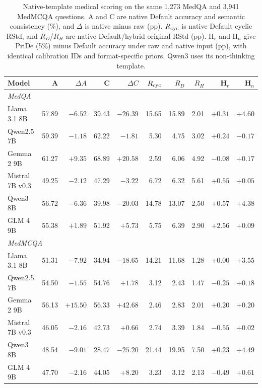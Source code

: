 \begin{table}[htbp]
\centering\footnotesize\setlength{\tabcolsep}{3pt}
\caption{Native-template medical scoring on the same 1,273 MedQA and 3,941 MedMCQA questions. A and C are native Default accuracy and semantic consistency (\%), and $\Delta$ is native minus raw (pp). $R_{\rm cyc}$ is native Default cyclic RStd, and $R_D$/$R_H$ are native Default/hybrid original RStd (pp). H$_r$ and H$_n$ give PriDe (5\%) minus Default accuracy under raw and native input (pp), with identical calibration IDs and format-specific priors. Qwen3 uses its non-thinking template.}
\label{tab:native-chat}
\begin{tabular}{lrrrrrrrrr}
\toprule
Model & A & $\Delta A$ & C & $\Delta C$ & $R_{\rm cyc}$ & $R_D$ & $R_H$ & H$_r$ & H$_n$\\
\midrule
\multicolumn{10}{l}{\textit{MedQA}}\\
Llama 3.1 8B & 57.89 & $-6.52$ & 39.43 & $-26.39$ & 15.65 & 15.89 & 2.01 & $+0.31$ & $+4.60$\\
Qwen2.5 7B & 59.39 & $-1.18$ & 62.22 & $-1.81$ & 5.30 & 4.75 & 3.02 & $+0.24$ & $-0.17$\\
Gemma 2 9B & 61.27 & $+9.35$ & 68.89 & $+20.58$ & 2.59 & 6.06 & 4.92 & $-0.08$ & $+0.17$\\
Mistral 7B v0.3 & 49.25 & $-2.12$ & 47.29 & $-3.22$ & 6.72 & 6.32 & 5.61 & $+0.55$ & $+0.05$\\
Qwen3 8B & 56.72 & $-6.36$ & 39.98 & $-20.03$ & 14.78 & 13.07 & 2.50 & $+0.57$ & $+4.38$\\
GLM 4 9B & 55.38 & $+1.89$ & 51.92 & $+5.73$ & 5.75 & 6.39 & 2.90 & $+2.56$ & $+0.09$\\
\multicolumn{10}{l}{\textit{MedMCQA}}\\
Llama 3.1 8B & 51.31 & $-7.92$ & 34.94 & $-18.65$ & 14.21 & 11.68 & 1.28 & $+0.00$ & $+3.55$\\
Qwen2.5 7B & 54.50 & $-1.55$ & 54.76 & $+1.78$ & 3.12 & 2.43 & 1.47 & $-0.25$ & $+0.18$\\
Gemma 2 9B & 56.13 & $+15.50$ & 56.33 & $+42.68$ & 2.46 & 2.83 & 2.01 & $+0.20$ & $+0.20$\\
Mistral 7B v0.3 & 46.05 & $-2.16$ & 42.73 & $+0.66$ & 2.74 & 3.39 & 1.84 & $-0.55$ & $+0.02$\\
Qwen3 8B & 48.54 & $-9.01$ & 28.47 & $-25.20$ & 21.44 & 19.95 & 7.50 & $+0.23$ & $+4.49$\\
GLM 4 9B & 47.70 & $-2.16$ & 44.05 & $+8.20$ & 3.23 & 3.12 & 2.13 & $-0.49$ & $+0.61$\\
\bottomrule
\end{tabular}
\end{table}
